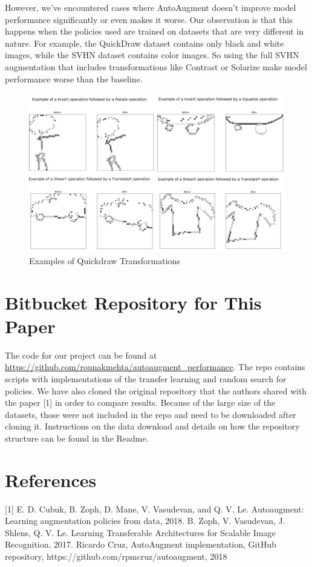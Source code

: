 \documentclass[10pt,twocolumn,letterpaper]{article}
\begin{document}
However, we’ve encountered cases where AutoAugment doesn’t improve model performance significantly or even makes it worse. Our observation is that this happens when the policies used are trained on datasets that are very different in nature. For example, the QuickDraw dataset contains only black and white images, while the SVHN dataset contains color images. So using the full SVHN augmentation that includes transformations like Contrast or Solarize make model performance worse than the baseline. 


\begin{figure}[bhp]
\includegraphics[width=\columnwidth]{quickdraw_compiled_transform_exmples.png}
\caption{Examples of Quickdraw Transformations}
\end{figure}


\section{Bitbucket Repository for This Paper}

The code for our project can be found at \url{https://github.com/rounakmehta/autoaugment_performance}. The repo contains scripts with implementations of the transfer learning and random search for policies. We have also cloned the original repository that the authors shared with the paper [1] in order to compare results. Because of the large size of the datasets, those were not included in the repo and need to be downloaded after cloning it. Instructions on the data download and details on how the repository structure can be found in the Readme.  

\section{References}

[1]  E. D. Cubuk, B. Zoph, D. Mane, V. Vasudevan, and Q. V. Le. Autoaugment:   Learning  augmentation  policies  from  data, 2018. \newline
[2] B. Zoph, V. Vasudevan, J. Shlens, Q. V. Le. Learning Transferable Architectures for Scalable Image Recognition, 2017. \newline
[3] Ricardo Cruz, AutoAugment implementation, GitHub repository, https://github.com/rpmcruz/autoaugment, 2018 \newline

{\small


}
\end{document}

